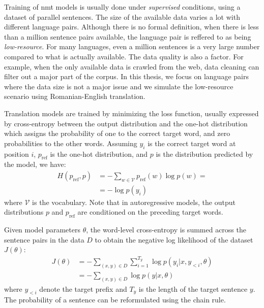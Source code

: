 Training of \ac{nmt} models is usually done under \emph{supervised} conditions,
using a dataset of parallel sentences.  The size of the available data varies a lot with
different language pairs. Although there is no formal definition, when there is
less than a million sentence pairs available, the language pair is reffered to
as being \emph{low-resource}. For many languages, even a million sentences is a
very large number compared to what is actually available. The data quality is
also a factor. For example, when the only available data is crawled from the
web, data cleaning can filter out a major part of the corpus. In this thesis,
we focus on language pairs where the data size is not a major issue and we
simulate the low-resource scenario using Romanian-English translation.

Translation models are trained by minimizing the loss function, usually
expressed by cross-entropy between the output distribution and the one-hot
distribution which assigns the probability of one to the correct target word,
and zero probabilities to the other words. Assuming $y_i$ is the correct target
word at position $i$, $p_{\text{ref}}$ is the one-hot distribution, and $p$ is
the distribution predicted by the model, we have:
%
\begin{equation}
  \begin{split}
    H(p_{\text{ref}}, p) &=  - \sum_{w \in \mathcal{V}} p_{\text{ref}}(w) \log p(w) = \\
    &=  - \log p(y_i)
  \end{split}
\end{equation}
%
where $\mathcal{V}$ is the vocabulary. Note that in autoregressive models, the
output distributions $p$ and $p_{\text{ref}}$ are conditioned on the preceding
target words.

Given model parameters $\theta$, the word-level cross-entropy is summed across
the sentence pairs in the data $D$ to obtain the negative log likelihood of the
dataset $J(\theta)$:
%
\begin{equation}
  \begin{split}
  J(\theta) &= - \sum_{(x, y) \in D} \sum_{i = 1}^{T_y} \log p(y_i | x, y_{<i}, \theta) \\
  &= - \sum_{(x, y) \in D} \log p(y | x, \theta)
  \end{split} \label{eq:loss}
\end{equation}
%
where $y_{<i}$ denote the target prefix and $T_{y}$ is the length of the target
sentence $y$. The probability of a sentence can be reformulated using the chain
rule.

